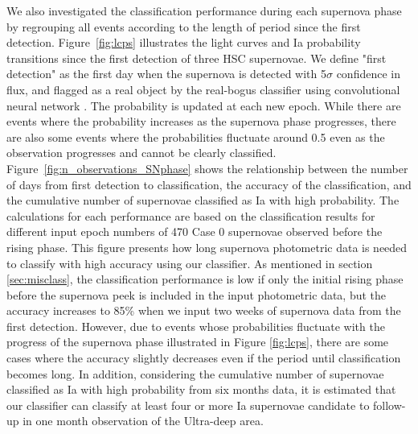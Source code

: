 \documentclass[useamsfonts]{pasj01}
\begin{document}
We also investigated the classification performance during each supernova phase by regrouping all events according to the length of period since the first detection.
Figure\ \ref{fig:lcps} illustrates the light curves and Ia probability transitions since the first detection of three HSC supernovae.
We define "first detection" as the first day when the supernova is detected with 5$\sigma$ confidence in flux, and flagged as a real object by the real-bogus classifier using convolutional neural network \citep{yasuda19a}.
The probability is updated at each new epoch.
While there are events where the probability increases as the supernova phase progresses, there are also some events where the probabilities fluctuate around 0.5 even as the observation progresses and cannot be clearly classified.
Figure\ \ref{fig:n_observations_SNphase} shows the relationship between the number of days from first detection to classification, the accuracy of the classification, and the cumulative number of supernovae classified as Ia with high probability.
The calculations for each performance are based on the classification results for different input epoch numbers of 470 Case 0 supernovae observed before the rising phase.
This figure presents how long supernova photometric data is needed to classify with high accuracy using our classifier.
As mentioned in section \ref{sec:misclass}, the classification performance is low if only the initial rising phase before the supernova peek is included in the input photometric data, but the accuracy increases to 85\% when we input two weeks of supernova data from the first detection.
However, due to events whose probabilities fluctuate with the progress of the supernova phase illustrated in Figure \ref{fig:lcps}, there are some cases where the accuracy slightly decreases even if the period until classification becomes long.
In addition, considering the cumulative number of supernovae classified as Ia with high probability from six months data, it is estimated that our classifier can classify at least four or more Ia supernovae candidate to follow-up in one month observation of the Ultra-deep area.
\end{document}

